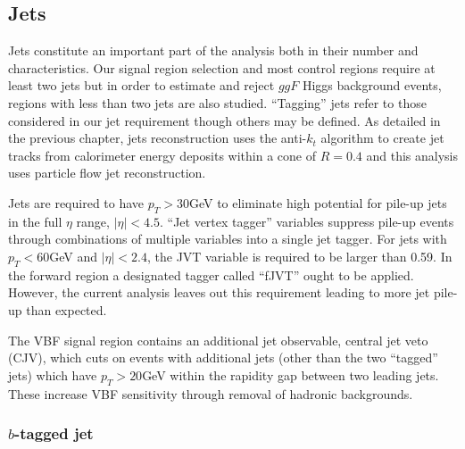 \begin{table}[h]
  \centering
  \caption{Muon selections}
  \label{tab:MuonSelection}
\end{table}


\subsection{Jets}

Jets constitute an important part of the analysis both in their number and characteristics. Our signal region selection and most control regions require at least two jets but in order to estimate and reject $ggF$ Higgs background events, regions with less than two jets are also studied. ``Tagging'' jets refer to those considered in our jet requirement though others may be defined. As detailed in the previous chapter, jets reconstruction uses the anti-$k_t$ algorithm to create jet tracks from calorimeter energy deposits within a cone of $R = 0.4$ and this analysis uses particle flow jet reconstruction.   

Jets are required to have $p_T > 30$GeV to eliminate high potential for pile-up jets in the full $\eta$ range, $|\eta| < 4.5$. ``Jet vertex tagger'' variables suppress pile-up events through combinations of multiple variables into a single jet tagger. For jets with $p_T < 60$GeV and $|\eta| < 2.4$, the JVT variable is required to be larger than 0.59. In the forward region a designated tagger called ``fJVT'' ought to be applied. However, the current analysis leaves out this requirement leading to more jet pile-up than expected. 

The VBF signal region contains an additional jet observable, central jet veto (CJV), which cuts on events with additional jets (other than the two ``tagged'' jets) which have $p_T>20$GeV within the rapidity gap between two leading jets. These increase VBF sensitivity through removal of hadronic backgrounds.
\subsubsection{$b$-tagged jet}

